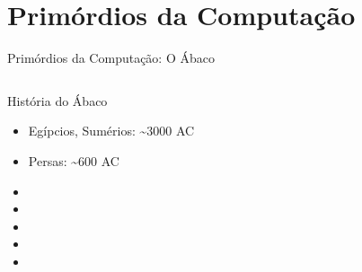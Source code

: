 \documentclass[10pt, compress, aspectratio=169, xcolor={table,usenames,dvipsnames}]{beamer}
\begin{document}
\section{Primórdios da Computação}
\label{sec:org315fd75}
\begin{frame}[label={sec:org9174d7f}]{Primórdios da Computação: O Ábaco}
\begin{columns}
\begin{column}{0.5\columnwidth}
\begin{block}{História do \alert{Ábaco}}
\begin{itemize}
\item Egípcios, \alert{Sumérios}: \textasciitilde{}3000 AC
\item Persas: \textasciitilde{}600 AC
\item {}
\item {}
\item {}
\item {}
\item {}
\end{itemize}
\end{block}
\end{column}

\begin{column}{0.5\columnwidth}


\end{column}
\end{columns}
\end{frame}
\end{document}
